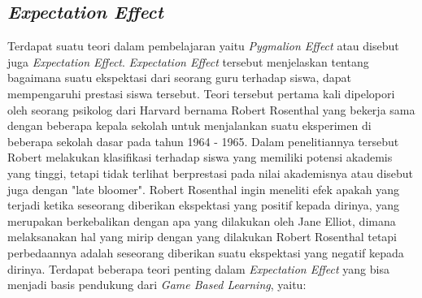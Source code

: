 	
	\subsection{\textit{Expectation Effect}}
	Terdapat suatu teori dalam pembelajaran yaitu \textit{Pygmalion Effect} atau disebut juga \textit{Expectation Effect}. \textit{Expectation Effect} tersebut menjelaskan tentang bagaimana suatu ekspektasi dari seorang guru terhadap siswa, dapat mempengaruhi prestasi siswa tersebut. Teori tersebut pertama kali dipelopori oleh seorang psikolog dari Harvard bernama Robert Rosenthal yang bekerja sama dengan beberapa kepala sekolah untuk menjalankan suatu eksperimen di beberapa sekolah dasar pada tahun  1964 - 1965. Dalam penelitiannya tersebut Robert melakukan klasifikasi terhadap siswa yang memiliki potensi akademis yang tinggi, tetapi tidak terlihat berprestasi pada nilai akademisnya atau disebut juga dengan "late bloomer". Robert Rosenthal ingin meneliti efek apakah yang terjadi ketika seseorang diberikan ekspektasi yang positif kepada dirinya, yang merupakan berkebalikan dengan apa yang dilakukan oleh Jane Elliot, dimana melaksanakan hal yang mirip dengan yang dilakukan Robert Rosenthal tetapi perbedaannya adalah seseorang diberikan suatu ekspektasi yang negatif kepada dirinya.
	\linebreak \linebreak
	Terdapat beberapa teori penting dalam \textit{Expectation Effect} yang bisa menjadi basis pendukung dari \textit{Game Based Learning}, yaitu:

